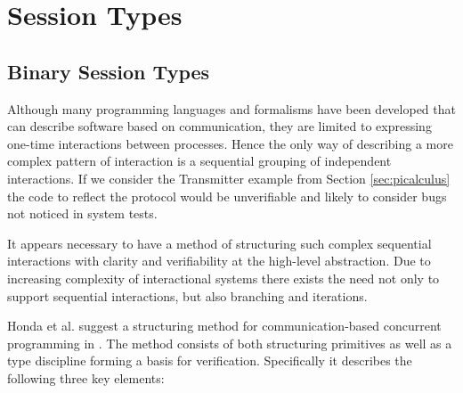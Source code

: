 
\section{Session Types}
\label{sec:sessiontypes}	
	
\subsection{Binary Session Types}
\label{subsec:binsessiontypes}
		
	Although many programming languages and formalisms have been developed that can describe software based on communication, they are limited to expressing one-time interactions between processes. Hence the only way of describing a more complex pattern of interaction is a sequential grouping of independent interactions. If we consider the Transmitter example from Section \ref{sec:picalculus} the code to reflect the protocol would be unverifiable and likely to consider bugs not noticed in system tests.

It appears necessary to have a method of structuring such complex sequential interactions with clarity and verifiability at the high-level abstraction. Due to increasing complexity of interactional systems there exists the need not only to support sequential interactions, but also branching and iterations.

Honda et al. suggest a structuring method for communication-based concurrent programming in \cite{language_primitives}. The method consists of both structuring primitives as well as a type discipline forming a basis for verification. Specifically it describes the following three key elements:

